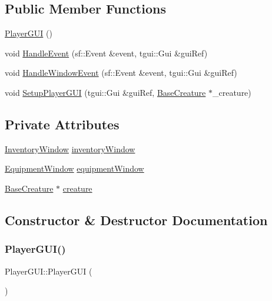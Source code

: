 \subsection*{Public Member Functions}
\begin{DoxyCompactItemize}
\item 
\mbox{\hyperlink{class_player_g_u_i_aee604e824ac2aa38c7d23112c137089d}{Player\+G\+UI}} ()
\item 
void \mbox{\hyperlink{class_player_g_u_i_a06602d2c26b2e1a3edad345d483c6132}{Handle\+Event}} (sf\+::\+Event \&event, tgui\+::\+Gui \&gui\+Ref)
\item 
void \mbox{\hyperlink{class_player_g_u_i_a1658f37b9e537d4a7377ca842bf60598}{Handle\+Window\+Event}} (sf\+::\+Event \&event, tgui\+::\+Gui \&gui\+Ref)
\item 
void \mbox{\hyperlink{class_player_g_u_i_a7fdc3f6f9478ea077ddaffd8d34a3854}{Setup\+Player\+G\+UI}} (tgui\+::\+Gui \&gui\+Ref, \mbox{\hyperlink{class_base_creature}{Base\+Creature}} $\ast$\+\_\+creature)
\end{DoxyCompactItemize}
\subsection*{Private Attributes}
\begin{DoxyCompactItemize}
\item 
\mbox{\hyperlink{class_inventory_window}{Inventory\+Window}} \mbox{\hyperlink{class_player_g_u_i_a6fc15fd1c326ce6b11c35387500a731d}{inventory\+Window}}
\item 
\mbox{\hyperlink{class_equipment_window}{Equipment\+Window}} \mbox{\hyperlink{class_player_g_u_i_a25828c4b259c6d9544b165e86381edad}{equipment\+Window}}
\item 
\mbox{\hyperlink{class_base_creature}{Base\+Creature}} $\ast$ \mbox{\hyperlink{class_player_g_u_i_a5916020676df5617cf1d3c9942dd6172}{creature}}
\end{DoxyCompactItemize}


\subsection{Constructor \& Destructor Documentation}
\mbox{\label{class_player_g_u_i_aee604e824ac2aa38c7d23112c137089d}} 
\subsubsection{\texorpdfstring{Player\+G\+U\+I()}{PlayerGUI()}}
{\footnotesize\ttfamily Player\+G\+U\+I\+::\+Player\+G\+UI (\begin{DoxyParamCaption}{ }\end{DoxyParamCaption})}



